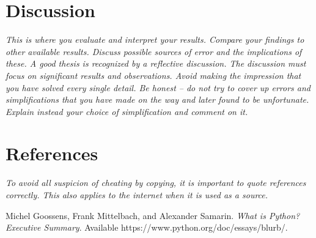 \documentclass{article}
\begin{document}
	\section{Discussion} \label{discussion}
	\em This is where you evaluate and interpret your results. Compare your findings to
	other available results. Discuss possible sources of error and the implications of these. A good
	thesis is recognized by a reflective discussion. The discussion must focus on significant
	results and observations. Avoid making the impression that you have solved every single
	detail. Be honest – do not try to cover up errors and simplifications that you have made on the
	way and later found to be unfortunate. Explain instead your choice of simplification and
	comment on it. \em 
	\pagebreak
	
	\section{References}
	\em To avoid all suspicion of cheating by copying, it is important to quote references
	correctly. This also applies to the internet when it is used as a source. \em
	
	\begin{thebibliography}{}
		
		 Michel Goossens, Frank Mittelbach, and Alexander Samarin. 
		\textit{What is Python? Executive Summary}. 
		Available https://www.python.org/doc/essays/blurb/.
	\end{thebibliography}
\end{document}

